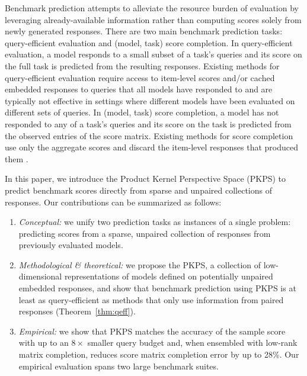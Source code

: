 \documentclass{article}
\theoremstyle{definition}
\theoremstyle{plain}
\newcommand{\PKPS}{PKPS\xspace}
\begin{document}
Benchmark prediction
attempts to alleviate the resource burden of evaluation by leveraging
already-available information rather than computing scores solely from newly generated
responses.
There are two main benchmark prediction tasks: query-efficient evaluation and
(model, task) score completion.
In query-efficient evaluation, a model responds to a small subset of a task's queries
and its score on the full task is predicted from the resulting responses.
Existing methods for query-efficient evaluation require access to item-level scores \citep{polo2024tinybenchmarks, hofmann2025fluid, li2024active,
bowyer2026efficient} and/or cached embedded responses \citep{dkps_qeff} to queries that all models have responded to and are typically not effective in settings where different models have been evaluated on different sets of queries.
In (model, task) score completion, a model has not responded to any of a task's
queries and its score on the task is predicted from the observed entries of the score
matrix.
Existing methods for score completion use only the aggregate scores and discard the
item-level responses that produced them \citep{benchpress}.

In this paper, we introduce the Product Kernel Perspective Space (\PKPS) to predict
benchmark scores directly from sparse and unpaired collections of responses.
Our contributions can be summarized as follows:
\begin{enumerate}
[wide, labelwidth=1pt, labelindent=12pt]
\setlength{\itemsep}{1pt}\setlength{\parskip}{0pt}
\item \emph{Conceptual:} we unify two prediction
tasks as instances
of a single problem: predicting scores from a sparse, unpaired collection of
responses from previously evaluated models.
\item \emph{Methodological \& theoretical:} we propose the \PKPS, a collection of
low-dimensional representations of models defined on potentially unpaired embedded
responses, and show that benchmark prediction using \PKPS is at least as
query-efficient as methods that only use information from paired responses
(Theorem~\ref{thm:qeff}).
\item \emph{Empirical:} we show
that \PKPS matches the accuracy of the sample score with up to an $8\times$ smaller
query budget and, when ensembled with low-rank matrix completion, reduces score
matrix completion error by up to 28\%. Our empirical evaluation spans two large benchmark suites.
\end{enumerate}
\end{document}
